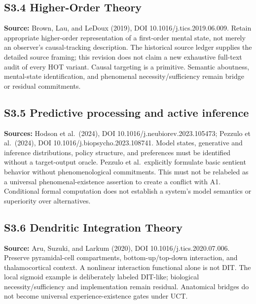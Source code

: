 \documentclass[
  11pt,
  a4paper,
]{article}
\begin{document}
\hypertarget{s3.4-higher-order-theory}{%
\subsection{S3.4 Higher-Order Theory}\label{s3.4-higher-order-theory}}

\textbf{Source:} Brown, Lau, and LeDoux (2019), DOI
10.1016/j.tics.2019.06.009. Retain appropriate higher-order
representation of a first-order mental state, not merely an observer's
causal-tracking description. The historical source ledger supplies the
detailed source framing; this revision does not claim a new exhaustive
full-text audit of every HOT variant. Causal targeting is a primitive.
Semantic aboutness, mental-state identification, and phenomenal
necessity/sufficiency remain bridge or residual commitments.

\hypertarget{s3.5-predictive-processing-and-active-inference}{%
\subsection{S3.5 Predictive processing and active
inference}\label{s3.5-predictive-processing-and-active-inference}}

\textbf{Sources:} Hodson et al.~(2024), DOI
10.1016/j.neubiorev.2023.105473; Pezzulo et al.~(2024), DOI
10.1016/j.biopsycho.2023.108741. Model states, generative and inference
distributions, policy structure, and preferences must be identified
without a target-output oracle. Pezzulo et al.~explicitly formulate
basic sentient behavior without phenomenological commitments. This must
not be relabeled as a universal phenomenal-existence assertion to create
a conflict with A1. Conditional formal computation does not establish a
system's model semantics or superiority over alternatives.

\hypertarget{s3.6-dendritic-integration-theory}{%
\subsection{S3.6 Dendritic Integration
Theory}\label{s3.6-dendritic-integration-theory}}

\textbf{Source:} Aru, Suzuki, and Larkum (2020), DOI
10.1016/j.tics.2020.07.006. Preserve pyramidal-cell compartments,
bottom-up/top-down interaction, and thalamocortical context. A nonlinear
interaction functional alone is not DIT. The local sigmoid example is
deliberately labeled DIT-like; biological necessity/sufficiency and
implementation remain residual. Anatomical bridges do not become
universal experience-existence gates under UCT.
\end{document}
